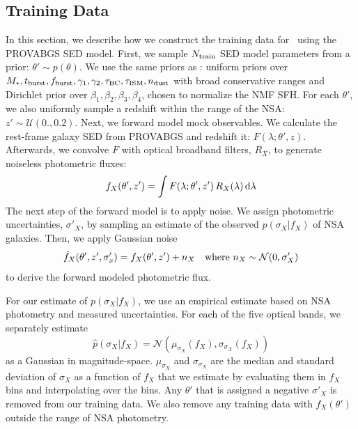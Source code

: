 \subsection{Training Data} \label{sec:training}
In this section, we describe how we construct the training data for
\sedflow~using the PROVABGS SED model.
First, we sample $N_{\rm train}$ SED model parameters from a prior: $\theta'\sim p(\theta)$. 
We use the same priors as \cite{hahn2022}: uniform priors over $M_*,
t_{\rm burst}, f_{\rm burst}, \gamma_1, \gamma_2, \tau_{\rm BC}, \tau_{\rm ISM},
n_{\rm dust}$ with broad conservative ranges and Dirichlet prior over $\beta_1,
\beta_2, \beta_3, \beta_4$, chosen to normalize the NMF SFH.
For each $\theta'$, we also uniformly sample a redshift within the range of the
NSA: $z' \sim \mathcal{U}(0., 0.2)$. 
Next, we forward model mock observables. 
We calculate the rest-frame galaxy SED from PROVABGS and redshift it: 
$F(\lambda;\theta', z)$. 
Afterwards, we convolve $F$ with optical broadband filters, $R_X$, to generate
noiseless photometric fluxes:
\begin{equation}
    f_X(\theta', z') = \int F(\lambda;\theta', z') \, R_X(\lambda) \, {\rm d}\lambda
\end{equation}
The next step of the forward model is to apply noise. 
We assign photometric uncertainties, $\sigma'_X$, by sampling an estimate of
the observed $p(\sigma_X | f_X)$ of NSA galaxies. 
Then, we apply Gaussian noise
\begin{equation} \label{eq:noise} 
    \hat{f}_X(\theta', z', \sigma'_x) = f_X(\theta', z') + n_X  \quad {\rm where}~n_X \sim \mathcal{N}(0, \sigma'_X)
\end{equation}
to derive the forward modeled photometric flux.

For our estimate of $p(\sigma_X | f_X)$, we use an empirical estimate based on
NSA photometry and measured uncertainties. 
For each of the five optical bands, we separately estimate  
\begin{equation}
    \hat{p}(\sigma_X | f_X) = \mathcal{N} \left( \mu_{\sigma_X}(f_X),
    \sigma_{\sigma_X}(f_X) \right)
\end{equation}
as a Gaussian in magnitude-space. 
$\mu_{\sigma_X}$ and $\sigma_{\sigma_X}$ are the median and standard deviation
of $\sigma_X$ as a function of $f_X$ that we estimate by evaluating them in
$f_X$ bins and interpolating over the bins. 
Any $\theta'$ that is assigned a negative $\sigma'_X$ is removed from our
training data. 
We also remove any training data with $f_X(\theta')$ outside the range of NSA
photometry. 

